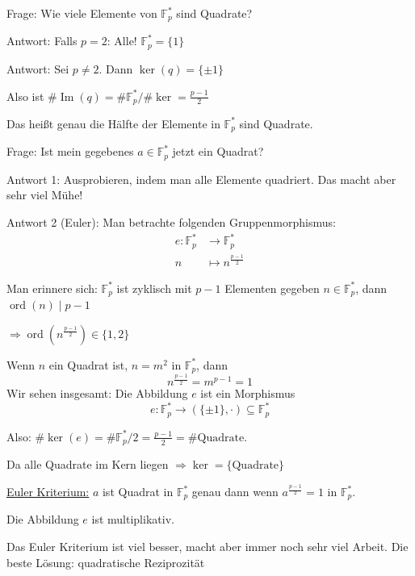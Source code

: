 \documentclass[12pt,parskip=full]{scrartcl}
\newcommand{\heading}{\underline}
\theoremstyle{definition}
\theoremstyle{remark}
\begin{document}
	Frage: Wie viele Elemente von $\mathbb{F}_p^*$ sind Quadrate?
	
	Antwort: Falls $p = 2$: Alle! $\mathbb{F}_p^* = \{ 1 \}$
	
	Antwort: Sei $p \neq 2$. Dann $\ker(q) = \{ \pm 1 \}$
	
	Also ist $\# \operatorname{Im}(q) = \#\mathbb{F}_p^* / \#\ker = \frac{p-1}{2}$
	
	Das heißt genau die Hälfte der Elemente in $\mathbb{F}_p^*$ sind Quadrate.
	
	Frage: Ist mein gegebenes $a \in \mathbb{F}_p^*$ jetzt ein Quadrat?
	
	Antwort 1: Ausprobieren, indem man alle Elemente quadriert. Das macht aber sehr viel Mühe!
	
	Antwort 2 (Euler): Man betrachte folgenden Gruppenmorphismus:
	\begin{align*}
		e: \mathbb{F}_p^* &\longrightarrow \mathbb{F}_p^* \\
		n &\longmapsto n^{\frac{p-1}{2}}
	\end{align*}
	
	Man erinnere sich: $\mathbb{F}_p^*$ ist zyklisch mit $p-1$ Elementen gegeben $n \in \mathbb{F}_p^*$, dann $\operatorname{ord}(n) \mid p-1$
	
	$\Rightarrow \operatorname{ord}(n^{\frac{p-1}{2}}) \in \{ 1, 2 \}$
	
	Wenn $n$ ein Quadrat ist, $n = m^2$ in $\mathbb{F}_p^*$, dann
	\begin{equation*}
		n^{\frac{p-1}{2}} = m^{p-1} = 1
	\end{equation*}
	Wir sehen insgesamt: Die Abbildung $e$ ist ein Morphismus
	\begin{equation*}
		e: \mathbb{F}_p^* \longrightarrow (\{ \pm 1 \}, \cdot) \subseteq \mathbb{F}_p^*
	\end{equation*}
	
	Also: $\# \ker(e) = \# \mathbb{F}_p^* / 2 = \frac{p-1}{2} = \# \text{Quadrate}$.
	
	Da alle Quadrate im Kern liegen $\Rightarrow \ker = \{ \text{Quadrate} \}$
	
	\heading{Euler Kriterium:} $a$ ist Quadrat in $\mathbb{F}_p^*$ genau dann wenn $a^{\frac{p-1}{2}} = 1$ in $\mathbb{F}_p^*$.
	
	Die Abbildung $e$ ist multiplikativ.
	
	Das Euler Kriterium ist viel besser, macht aber immer noch sehr viel Arbeit. Die beste Lösung: quadratische Reziprozität
	
\end{document}
